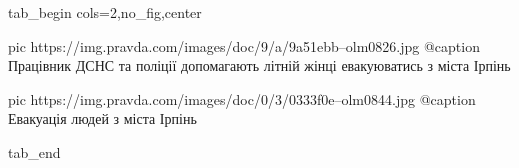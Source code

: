  
 
 
 
 


\ifcmt
  tab_begin cols=2,no_fig,center

     pic https://img.pravda.com/images/doc/9/a/9a51ebb--olm0826.jpg
		 @caption Працівник ДСНС та поліції допомагають літній жінці евакуюватись з міста Ірпінь

		 pic https://img.pravda.com/images/doc/0/3/0333f0e--olm0844.jpg
		 @caption Евакуація людей з міста Ірпінь

  tab_end
\fi
